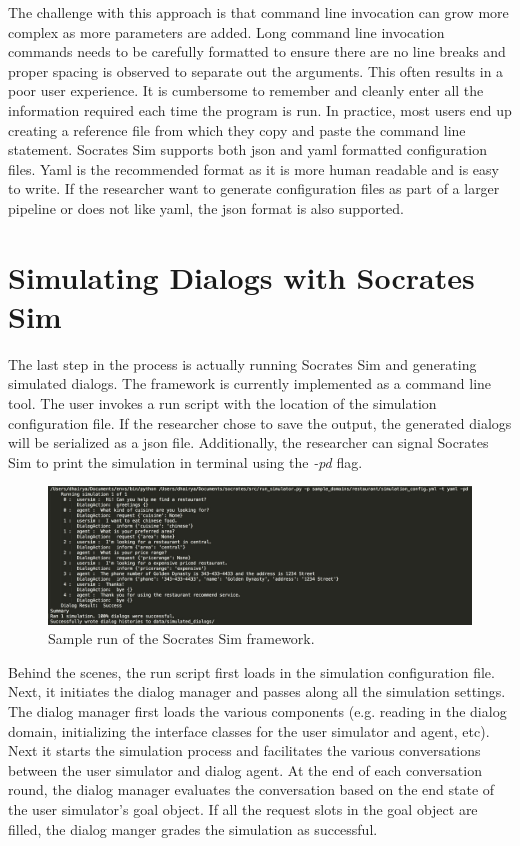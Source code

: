 The challenge with this approach is that command line invocation can grow more complex as more parameters are added. Long command line invocation commands needs to be carefully formatted to ensure there are no line breaks and proper spacing is observed to separate out the arguments. This often results in a poor user experience. It is cumbersome to remember and cleanly enter all the information required each time the program is run. In practice, most users end up creating a reference file from which they copy and paste the command line statement. Socrates Sim supports both json and yaml formatted configuration files. Yaml is the recommended format as it is more human readable and is easy to write. If the researcher want to generate configuration files as part of a larger pipeline or does not like yaml, the json format is also supported. 

\section{Simulating Dialogs with Socrates Sim}

The last step in the process is actually running Socrates Sim and generating simulated dialogs. The framework is currently implemented as a command line tool. The user invokes a run script with the location of the simulation configuration file. If the researcher chose to save the output, the generated dialogs will be serialized as a json file. Additionally, the researcher can signal Socrates Sim to print the simulation in terminal using the \textit{-pd} flag. 

\begin{figure}[h!]
	\centering
	\includegraphics[scale=.15]{diagrams/sample_run.jpeg}
	\caption{ Sample run of the Socrates Sim framework. }
	\label{fig:sample_run}
\end{figure}

Behind the scenes, the run script first loads in the simulation configuration file. Next, it initiates the dialog manager and passes along all the simulation settings. The dialog manager first loads the various components (e.g. reading in the dialog domain, initializing the interface classes for the user simulator and agent, etc). Next it starts the simulation process and facilitates the various conversations between the user simulator and dialog agent. At the end of each conversation round, the dialog manager evaluates the conversation based on the end state of the user simulator's goal object. If all the request slots in the goal object are filled, the dialog manger grades the simulation as successful. 


